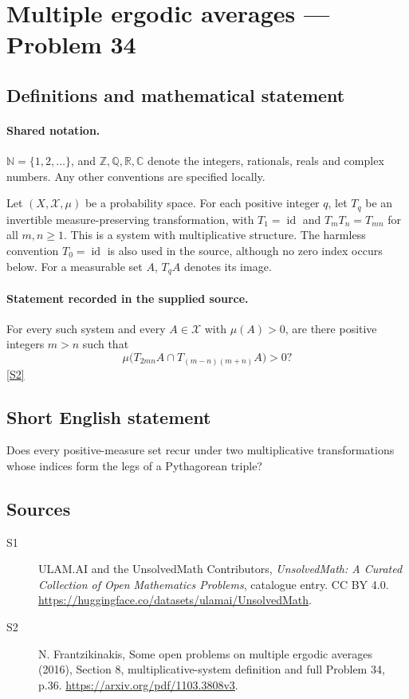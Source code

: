 \documentclass[11pt]{article}
\newcommand{\sref}[2]{\hyperlink{source:#1:#2}{[S#2]}}
\begin{document}
\section{Multiple ergodic averages — Problem 34}\label{statement}

\subsection{Definitions and mathematical statement}

\paragraph{Shared notation.}$\mathbb N=\{1,2,\ldots\}$, and $\mathbb Z,\mathbb Q,\mathbb R,\mathbb C$ denote the integers, rationals, reals and complex numbers. Any other conventions are specified locally.


Let $(X,\mathcal X,\mu)$ be a probability space. For each positive integer $q$, let $T_q$ be an invertible measure-preserving transformation, with $T_1=\operatorname{id}$ and $T_mT_n=T_{mn}$ for all $m,n\ge1$. This is a system with multiplicative structure. The harmless convention $T_0=\operatorname{id}$ is also used in the source, although no zero index occurs below. For a measurable set $A$, $T_qA$ denotes its image.
\paragraph{Statement recorded in the supplied source.}
For every such system and every $A\in\mathcal X$ with $\mu(A)>0$, are there positive integers $m>n$ such that \[\mu\bigl(T_{2mn}A\cap T_{(m-n)(m+n)}A\bigr)>0?\] \sref{statement}{2}
\subsection{Short English statement}
Does every positive-measure set recur under two multiplicative transformations whose indices form the legs of a Pythagorean triple?
\subsection{Sources}
\begin{description}
\item[\hypertarget{source:statement:1}{S1}] ULAM.AI and the UnsolvedMath Contributors, \emph{UnsolvedMath: A Curated Collection of Open Mathematics Problems}, catalogue entry. CC BY 4.0. \url{https://huggingface.co/datasets/ulamai/UnsolvedMath}.
\item[\hypertarget{source:statement:2}{S2}] N. Frantzikinakis, Some open problems on multiple ergodic averages (2016), Section 8, multiplicative-system definition and full Problem 34, p.36. \url{https://arxiv.org/pdf/1103.3808v3}.
\end{description}
\label{end:statement}
\end{document}
